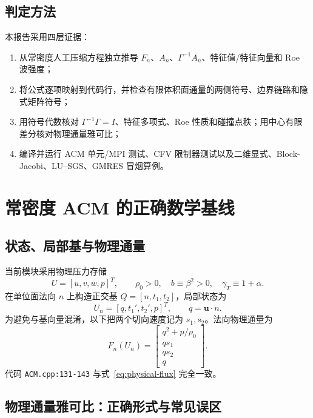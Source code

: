 \documentclass[UTF8,11pt,a4paper]{ctexart}
\newcommand{\code}[1]{\nolinkurl{#1}}
\begin{document}
\subsection{判定方法}

本报告采用四层证据：

\begin{enumerate}
  \item 从常密度人工压缩方程独立推导 $F_n$、$A_n$、$\Gamma^{-1}A_n$、特征值/特征向量和 Roe 波强度；
  \item 将公式逐项映射到代码行，并检查有限体积面通量的两侧符号、边界链路和隐式矩阵符号；
  \item 用符号代数核对 $\Gamma^{-1}\Gamma=I$、特征多项式、Roe 性质和碰撞点秩；用中心有限差分核对物理通量雅可比；
  \item 编译并运行 ACM 单元/MPI 测试、CFV 限制器测试以及二维显式、Block-Jacobi、LU--SGS、GMRES 冒烟算例。
\end{enumerate}

\section{常密度 ACM 的正确数学基线}

\subsection{状态、局部基与物理通量}

当前模块采用物理压力存储
\begin{equation}
  U=[u,v,w,p]^T,
  \qquad \rho_0>0,\quad b\equiv\beta^2>0,\quad \gamma_T\equiv1+\alpha.
\end{equation}
在单位面法向 $n$ 上构造正交基 $Q=[n,t_1,t_2]$，局部状态为
\begin{equation}
  U_n=[q,t_1',t_2',p]^T,
  \qquad q=\bm u\cdot n.
\end{equation}
为避免与基向量混淆，以下把两个切向速度记为 $s_1,s_2$。法向物理通量为
\begin{equation}
  F_n(U_n)=
  \begin{bmatrix}
  q^2+p/\rho_0\\ qs_1\\ qs_2\\ q
  \end{bmatrix}.
  \label{eq:physical-flux}
\end{equation}
代码 \code{ACM.cpp:131-143} 与式~\eqref{eq:physical-flux} 完全一致。

\subsection{物理通量雅可比：正确形式与常见误区}
\end{document}
